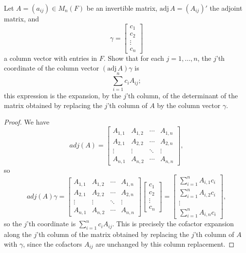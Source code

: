 \begin{tcolorbox}[title=Problem 3, breakable]
Let $A = (a_{ij}) \in M_n(F)$ be an invertible matrix, $\text{adj}\, A = (A_{ij})'$ the adjoint matrix, and
\[
\gamma = \begin{bmatrix} c_1 \\ c_2 \\ \vdots \\ c_n \end{bmatrix}
\]
a column vector with entries in $F$. Show that for each $j = 1, \ldots, n$, the $j$'th coordinate of the column vector $(\text{adj}\, A)\gamma$ is
\[
\sum_{i=1}^{n} c_i A_{ij};
\]
this expression is the expansion, by the $j$'th column, of the determinant of the matrix obtained by replacing the $j$'th column of $A$ by the column vector $\gamma$.
\end{tcolorbox}

\begin{proof}
    We have 
    \[adj(A) = 
        \begin{bmatrix}
            A_{1,1} & A_{1,2} & \cdots & A_{1,n} \\
            A_{2,1} & A_{2,2} & \cdots & A_{2,n} \\
            \vdots  & \vdots  & \ddots & \vdots  \\
            A_{n,1} & A_{n,2} & \cdots & A_{n,n}
        \end{bmatrix},
    \]
    so 
    \[adj(A) \gamma = 
    \begin{bmatrix}
        A_{1,1} & A_{1,2} & \cdots & A_{1,n} \\
        A_{2,1} & A_{2,2} & \cdots & A_{2,n} \\
        \vdots  & \vdots  & \ddots & \vdots  \\
        A_{n,1} & A_{n,2} & \cdots & A_{n,n}
    \end{bmatrix}
    \begin{bmatrix} c_1 \\ c_2 \\ \vdots \\ c_n \end{bmatrix}
    = 
    \begin{bmatrix}
        \sum_{i=1}^n A_{i,1} c_i \\
        \sum_{i=1}^n A_{i,2} c_i \\
        \vdots \\
        \sum_{i=1}^n A_{i,n} c_i
    \end{bmatrix},
    \]
    so the $j$'th coordinate is $\sum_{i=1}^n c_i A_{ij}$.
    This is precisely the cofactor expansion along the $j$'th column of the matrix obtained
    by replacing the $j$'th column of $A$ with $\gamma$, since the cofactors $A_{ij}$ are
    unchanged by this column replacement.
\end{proof}


